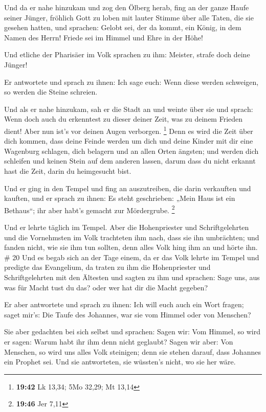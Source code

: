  Und da er nahe hinzukam und zog den Ölberg herab, fing an
der ganze Haufe seiner Jünger, fröhlich Gott zu loben mit lauter Stimme
über alle Taten, die sie gesehen hatten,  und sprachen:
Gelobt sei, der da kommt, ein König, in dem Namen des Herrn! Friede sei
im Himmel und Ehre in der Höhe!

 Und etliche der Pharisäer im Volk sprachen zu ihm:
Meister, strafe doch deine Jünger!

 Er antwortete und sprach zu ihnen: Ich sage euch: Wenn
diese werden schweigen, so werden die Steine schreien.

 Und als er nahe hinzukam, sah er die Stadt an und weinte
über sie  und sprach: Wenn doch auch du erkenntest zu
dieser deiner Zeit, was zu deinem Frieden dient! Aber nun ist's vor
deinen Augen verborgen. \footnote{\textbf{19:42} Lk 13,34; 5Mo 32,29; Mt
  13,14}  Denn es wird die Zeit über dich kommen, dass
deine Feinde werden um dich und deine Kinder mit dir eine Wagenburg
schlagen, dich belagern und an allen Orten ängsten;  und
werden dich schleifen und keinen Stein auf dem anderen lassen, darum
dass du nicht erkannt hast die Zeit, darin du heimgesucht bist.

 Und er ging in den Tempel und fing an auszutreiben, die
darin verkauften und kauften,  und er sprach zu ihnen: Es
steht geschrieben: „Mein Haus ist ein Bethaus``; ihr aber habt's gemacht
zur Mördergrube. \footnote{\textbf{19:46} Jer 7,11}

 Und er lehrte täglich im Tempel. Aber die Hohenpriester
und Schriftgelehrten und die Vornehmsten im Volk trachteten ihm nach,
dass sie ihn umbrächten;  und fanden nicht, wie sie ihm tun
sollten, denn alles Volk hing ihm an und hörte ihn. \# 20 
Und es begab sich an der Tage einem, da er das Volk lehrte im Tempel und
predigte das Evangelium, da traten zu ihm die Hohenpriester und
Schriftgelehrten mit den Ältesten  und sagten zu ihm und
sprachen: Sage uns, aus was für Macht tust du das? oder wer hat dir die
Macht gegeben?

 Er aber antwortete und sprach zu ihnen: Ich will euch auch
ein Wort fragen; saget mir's:  Die Taufe des Johannes, war
sie vom Himmel oder von Menschen?

 Sie aber gedachten bei sich selbst und sprachen: Sagen wir:
Vom Himmel, so wird er sagen: Warum habt ihr ihm denn nicht geglaubt?
 Sagen wir aber: Von Menschen, so wird uns alles Volk
steinigen; denn sie stehen darauf, dass Johannes ein Prophet sei.
 Und sie antworteten, sie wüssten's nicht, wo sie her wäre.

